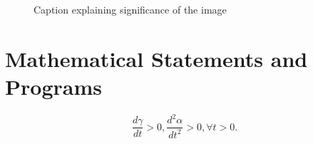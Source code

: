 \begin{sloppypar}
\begin{figure}[ht]
\begin{tikzpicture}[scale=3,block/.style={text width=11.2em}]
    \end{tikzpicture}
    \caption{Caption explaining significance of the image}
    \label{fig:my_label}
\end{figure}

\section{Mathematical Statements and Programs}

\begin{equation}
\frac{d\gamma}{dt} > 0,
\frac{d^2\alpha}{dt^2} > 0,
\forall t > 0.
\end{equation}

\end{sloppypar}